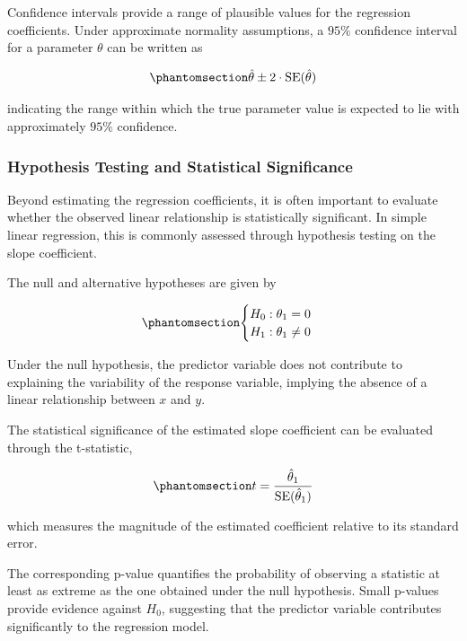 \documentclass[
  12pt,
  letterpaper,
]{book}
\begin{document}
Confidence intervals provide a range of plausible values for the
regression coefficients. Under approximate normality assumptions, a
\(95\%\) confidence interval for a parameter \(\theta\) can be written
as

\begin{equation}\phantomsection\label{eq-confidence-interval}{
\hat{\theta}
\pm
2 \cdot \mathrm{SE}(\hat{\theta})
}\end{equation}

indicating the range within which the true parameter value is expected
to lie with approximately \(95\%\) confidence.

\subsubsection{Hypothesis Testing and Statistical
Significance}\label{hypothesis-testing-and-statistical-significance}

Beyond estimating the regression coefficients, it is often important to
evaluate whether the observed linear relationship is statistically
significant. In simple linear regression, this is commonly assessed
through hypothesis testing on the slope coefficient.

The null and alternative hypotheses are given by

\begin{equation}\phantomsection\label{eq-hypothesis-test}{
\begin{cases}
H_0 : \theta_1 = 0 \\
H_1 : \theta_1 \neq 0
\end{cases}
}\end{equation}

Under the null hypothesis, the predictor variable does not contribute to
explaining the variability of the response variable, implying the
absence of a linear relationship between \(x\) and \(y\).

The statistical significance of the estimated slope coefficient can be
evaluated through the t-statistic,

\begin{equation}\phantomsection\label{eq-t-statistic}{
t
=
\frac{
\hat{\theta}_1
}{
\mathrm{SE}(\hat{\theta}_1)
}
}\end{equation}

which measures the magnitude of the estimated coefficient relative to
its standard error.

The corresponding p-value quantifies the probability of observing a
statistic at least as extreme as the one obtained under the null
hypothesis. Small p-values provide evidence against \(H_0\), suggesting
that the predictor variable contributes significantly to the regression
model.
\end{document}
